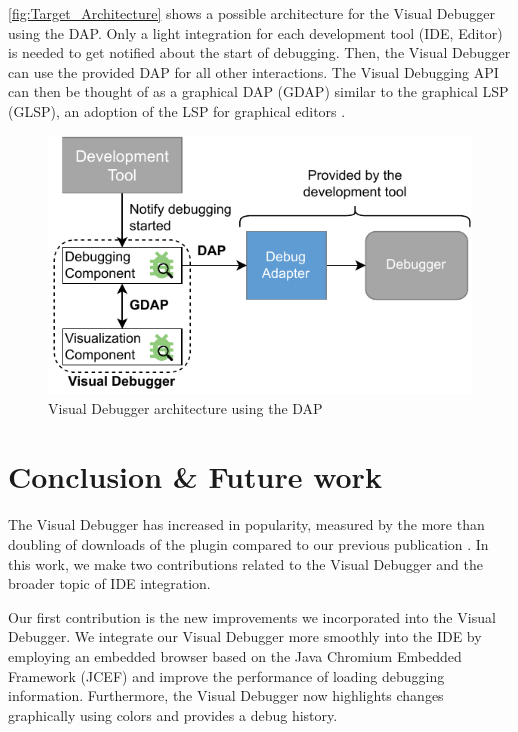 \documentclass[sigconf]{acmart}
\begin{document}
\autoref{fig:Target_Architecture} shows a possible architecture for the Visual Debugger using the DAP.
Only a light integration for each development tool (IDE, Editor) is needed to get notified about the start of debugging.
Then, the Visual Debugger can use the provided DAP for all other interactions.
The Visual Debugging API can then be thought of as a graphical DAP (GDAP) similar to the graphical LSP (GLSP), an adoption of the LSP for graphical editors \cite{rodriguez-echeverriaLanguageServerProtocol2018,borkVisionFlexibleGLSPBased2024}.

\begin{figure}[ht]
  \centering
  \includegraphics[width=0.99\linewidth]{images/visual-debugger-Target-architecture.pdf}
  \caption{Visual Debugger architecture using the DAP}
  \label{fig:Target_Architecture}
\end{figure}

\section{Conclusion \& Future work} \label{sec:conclusion}
The Visual Debugger has increased in popularity, measured by the more than doubling of downloads of the plugin compared to our previous publication \cite{krauterVisualDebuggerTool2022}.
In this work, we make two contributions related to the Visual Debugger and the broader topic of IDE integration.

Our first contribution is the new improvements we incorporated into the Visual Debugger.
We integrate our Visual Debugger more smoothly into the IDE by employing an embedded browser based on the Java Chromium Embedded Framework (JCEF) and improve the performance of loading debugging information.
Furthermore, the Visual Debugger now highlights changes graphically using colors and provides a debug history.
\end{document}
